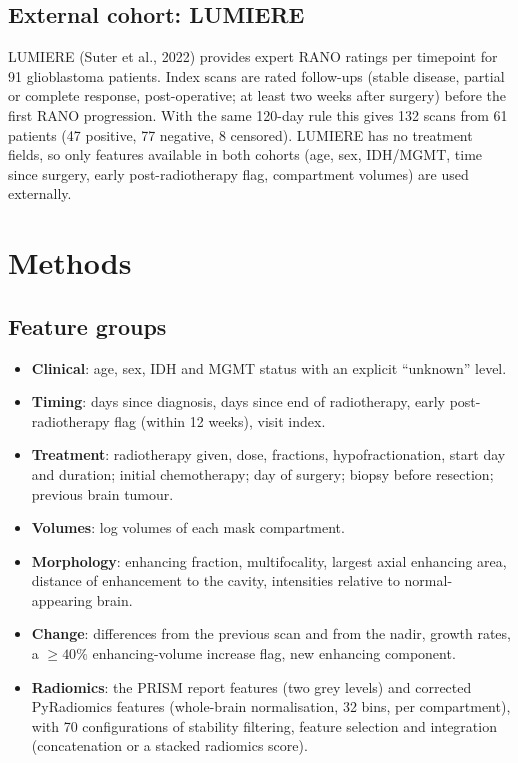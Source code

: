 \documentclass[11pt,a4paper]{article}
\begin{document}
\subsection{External cohort: LUMIERE}
LUMIERE (Suter et al., 2022) provides expert RANO ratings per timepoint for 91 glioblastoma patients. Index scans are
rated follow-ups (stable disease, partial or complete response, post-operative; at least two weeks after surgery)
before the first RANO progression. With the same 120-day rule this gives 132 scans from 61 patients (47 positive,
77 negative, 8 censored). LUMIERE has no treatment fields, so only features available in both cohorts (age, sex,
IDH/MGMT, time since surgery, early post-radiotherapy flag, compartment volumes) are used externally.

\section{Methods}

\subsection{Feature groups}
\begin{itemize}
\item \textbf{Clinical}: age, sex, IDH and MGMT status with an explicit ``unknown'' level.
\item \textbf{Timing}: days since diagnosis, days since end of radiotherapy, early post-radiotherapy flag
(within 12 weeks), visit index.
\item \textbf{Treatment}: radiotherapy given, dose, fractions, hypofractionation, start day and duration; initial
chemotherapy; day of surgery; biopsy before resection; previous brain tumour.
\item \textbf{Volumes}: log volumes of each mask compartment.
\item \textbf{Morphology}: enhancing fraction, multifocality, largest axial enhancing area, distance of enhancement to
the cavity, intensities relative to normal-appearing brain.
\item \textbf{Change}: differences from the previous scan and from the nadir, growth rates, a $\geq 40\%$ enhancing-volume
increase flag, new enhancing component.
\item \textbf{Radiomics}: the PRISM report features (two grey levels) and corrected PyRadiomics features (whole-brain
normalisation, 32 bins, per compartment), with 70 configurations of stability filtering, feature selection and
integration (concatenation or a stacked radiomics score).
\end{itemize}
\end{document}
